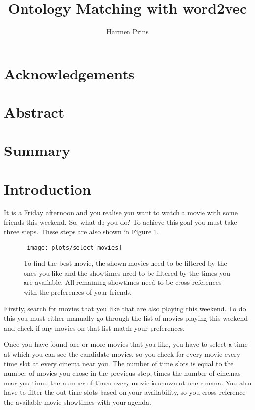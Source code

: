 \documentclass{article}
\title{Ontology Matching with word2vec}
\author{Harmen Prins}
\begin{document}
 \maketitle
 \newpage
 
 \section*{Acknowledgements}
 \section*{Abstract}  
 
 \section*{Summary}
 \tableofcontents
 \newpage
 
 \section{Introduction} \label{intro}
 It is a Friday afternoon and you realise you want to watch a movie with some friends this weekend. So, what do you do? To achieve this goal you must take three steps. These steps are also shown in Figure \ref{movies}.
  
 \begin{figure}[H]
 \centering
 \texttt{[image: plots/select\_movies]}
 \caption[Movie selection process]{To find the best movie, the shown movies need to be filtered by the ones you like and the showtimes need to be filtered by the times you are available. All remaining showtimes need to be cross-references with the preferences of your friends.}
 \label{movies}
 \end{figure}
 
 Firstly, search for movies that you like that are also playing this weekend. To do this you must either manually go through the list of movies playing this weekend and check if any movies on that list match your preferences.
 
 Once you have found one or more movies that you like, you have to select a time at which you can see the candidate movies, so you check for every movie every time slot at every cinema near you. The number of time slots is equal to the number of movies you chose in the previous step, times the number of cinemas near you times the number of times every movie is shown at one cinema. You also have to filter the out time slots based on your availability, so you cross-reference the available movie showtimes with your agenda.
 
\end{document}
